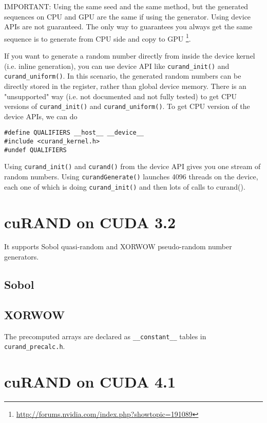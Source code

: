 IMPORTANT: Using the same seed and the same method, but the generated sequences
on CPU and GPU are the same if using the generator. Using device APIs are not
guaranteed. The only way to guarantees you always get the same sequence is to
generate from CPU side and copy to GPU \footnote{\url{http://forums.nvidia.com/index.php?showtopic=191089}}. 


If you want to generate a random number directly from inside the device kernel
(i.e. inline generation), you can use device API like \verb!curand_init()! and
\verb!curand_uniform()!. In this scenario, the generated random numbers can be directly stored in the
register, rather than global device memory. There is an "unsupported" way
(i.e. not documented and not fully tested) to get CPU versions of
\verb!curand_init()! and \verb!curand_uniform()!. To get CPU version of the
device APIs, we can do
\begin{verbatim}
#define QUALIFIERS __host__ __device__
#include <curand_kernel.h>
#undef QUALIFIERS
\end{verbatim}

Using \verb!curand_init()! and \verb!curand()! from the device API gives you one
stream of random numbers. Using \verb!curandGenerate()! launches 4096 threads on
the device, each one of which is doing \verb!curand_init()! and then lots of
calls to curand().



\section{cuRAND on CUDA 3.2}
\label{sec:cuRAND_CUDA3.2}

It supports Sobol quasi-random and XORWOW pseudo-random number generators.
  
\subsection{Sobol}

\subsection{XORWOW}

The precomputed arrays are declared as \verb!__constant__! tables in
\verb!curand_precalc.h!.


\section{cuRAND on CUDA 4.1}
\label{sec:cuRAND_CUDA4.1}

